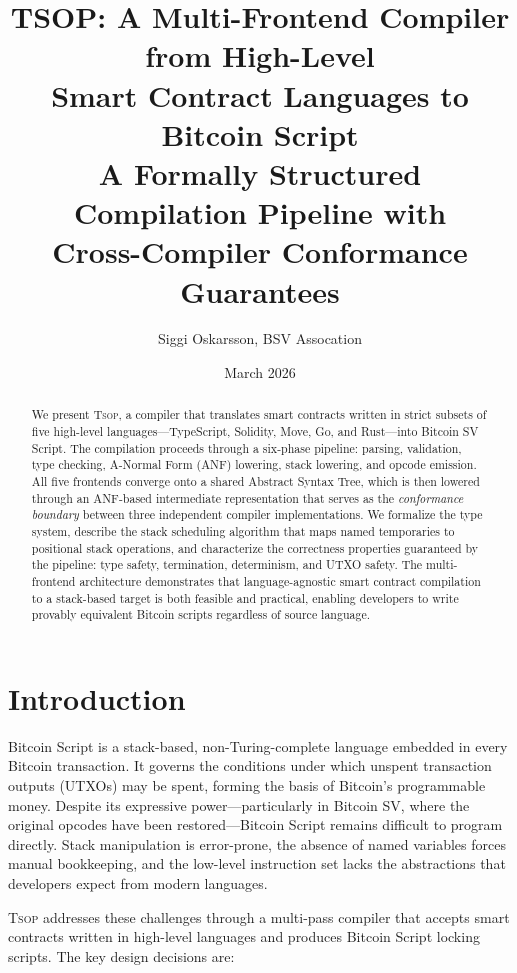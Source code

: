 \documentclass[11pt,a4paper]{article}
\title{%
  \textbf{TSOP: A Multi-Frontend Compiler from High-Level\\
  Smart Contract Languages to Bitcoin Script}\\[0.5em]
  \large A Formally Structured Compilation Pipeline with\\
  Cross-Compiler Conformance Guarantees
}
\author{Siggi Oskarsson, BSV Assocation}
\date{March 2026}
\newcommand{\tsop}{\textsc{Tsop}}
\begin{document}
\maketitle

\begin{abstract}
We present \tsop{}, a compiler that translates smart contracts written in
strict subsets of five high-level languages---TypeScript, Solidity, Move, Go,
and Rust---into Bitcoin SV Script. The compilation proceeds through a
six-phase pipeline: parsing, validation, type checking, A-Normal Form (ANF)
lowering, stack lowering, and opcode emission. All five frontends converge
onto a shared Abstract Syntax Tree, which is then lowered through an
ANF-based intermediate representation that serves as the \emph{conformance
boundary} between three independent compiler implementations. We formalize
the type system, describe the stack scheduling algorithm that maps named
temporaries to positional stack operations, and characterize the correctness
properties guaranteed by the pipeline: type safety, termination, determinism,
and UTXO safety. The multi-frontend architecture demonstrates that
language-agnostic smart contract compilation to a stack-based target is
both feasible and practical, enabling developers to write provably
equivalent Bitcoin scripts regardless of source language.
\end{abstract}

\tableofcontents
\newpage

\section{Introduction}
\label{sec:intro}

Bitcoin Script is a stack-based, non-Turing-complete language embedded in
every Bitcoin transaction. It governs the conditions under which unspent
transaction outputs (UTXOs) may be spent, forming the basis of Bitcoin's
programmable money. Despite its expressive power---particularly in Bitcoin SV,
where the original opcodes have been restored---Bitcoin Script remains
difficult to program directly. Stack manipulation is error-prone, the absence
of named variables forces manual bookkeeping, and the low-level instruction
set lacks the abstractions that developers expect from modern languages.

\tsop{} addresses these challenges through a multi-pass compiler that accepts
smart contracts written in high-level languages and produces Bitcoin Script
locking scripts. The key design decisions are:
\end{document}
